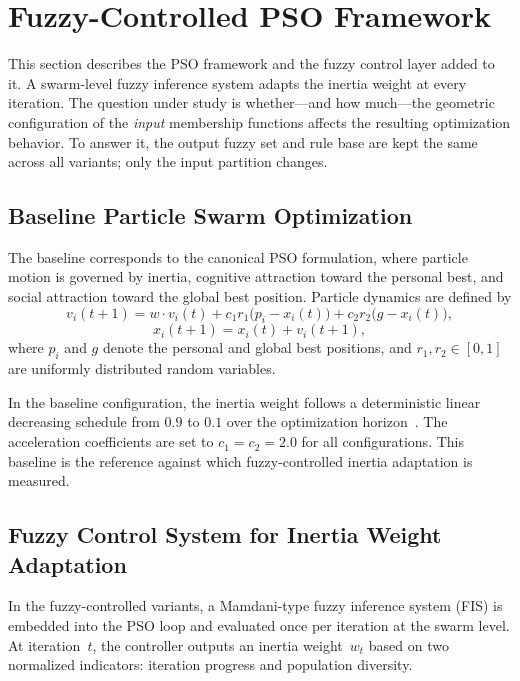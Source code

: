 \documentclass[conference]{IEEEtran}
\begin{document}
\section{Fuzzy-Controlled PSO Framework}
\label{sec:framework}

This section describes the PSO framework and the fuzzy control layer added to it. A swarm-level fuzzy inference system adapts the inertia weight at every iteration. The question under study is whether---and how much---the geometric configuration of the \emph{input} membership functions affects the resulting optimization behavior. To answer it, the output fuzzy set and rule base are kept the same across all variants; only the input partition changes.

\subsection{Baseline Particle Swarm Optimization}
\label{subsec:baseline_pso}

The baseline corresponds to the canonical PSO formulation, where particle motion is governed by inertia, cognitive attraction toward the personal best, and social attraction toward the global best position. Particle dynamics are defined by
\begin{equation}
    v_i(t{+}1) = w \cdot v_i(t) + c_1 r_1 \bigl(p_i - x_i(t)\bigr) + c_2 r_2 \bigl(g - x_i(t)\bigr),
    \label{eq:pso_velocity}
\end{equation}
\begin{equation}
    x_i(t{+}1) = x_i(t) + v_i(t{+}1),
    \label{eq:pso_position}
\end{equation}
where $p_i$ and $g$ denote the personal and global best positions, and $r_1, r_2 \in [0,1]$ are uniformly distributed random variables.

In the baseline configuration, the inertia weight follows a deterministic linear decreasing schedule from $0.9$ to $0.1$ over the optimization horizon~\cite{abualigah2021arithmetic}. The acceleration coefficients are set to $c_1 = c_2 = 2.0$ for all configurations. This baseline is the reference against which fuzzy-controlled inertia adaptation is measured.

\subsection{Fuzzy Control System for Inertia Weight Adaptation}
\label{subsec:fcs}

In the fuzzy-controlled variants, a Mamdani-type fuzzy inference system (FIS) is embedded into the PSO loop and evaluated once per iteration at the swarm level. At iteration~$t$, the controller outputs an inertia weight~$w_t$ based on two normalized indicators: iteration progress and population diversity.
\end{document}
